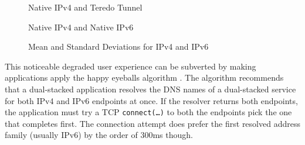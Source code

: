 \begin{figure}[t]
  \begin{minipage}[t]{0.50\textwidth}
    \centering
    \caption{Native IPv4 and Teredo Tunnel}
  \end{minipage}
  \begin{minipage}[t]{0.50\textwidth}
    \centering
    \caption{Native IPv4 and Native IPv6}
  \end{minipage}
\caption{\label{fig:happy-v4-v6-mean-std} Mean and Standard Deviations for
IPv4 and IPv6}
\end{figure}

This noticeable degraded user experience can be subverted by making
applications apply the happy eyeballs algorithm \cite{rfc6555}. The algorithm
recommends that a dual-stacked application resolves the DNS names of a
dual-stacked service for both IPv4 and IPv6 endpoints at once. If the resolver
returns both endpoints, the application must try a TCP
\texttt{connect(\ldots)} to both the endpoints pick the one that
completes first. The connection attempt does prefer the first resolved
address family (usually IPv6) by the order of 300ms though.

